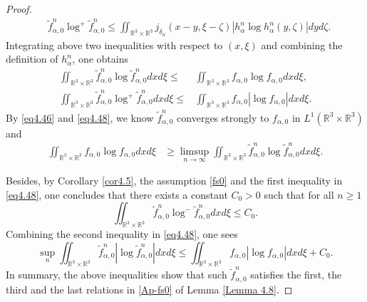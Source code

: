 \documentclass[reqno,11pt]{amsart}
\numberwithin{equation}{section}
\def\R{\mathbb{R}}
\begin{document}
\begin{proof}
\begin{equation*}
\begin{aligned}
			&\tilde{f}^n_{\alpha,0 } \log ^+ \tilde{f}^n_{\alpha,0 } \leq \iint_{\R^3 \times \R^3 } j_{\delta_n } (x-y, \xi - \zeta ) | h^n_\alpha \log h^n_\alpha (y,\zeta )|dyd\zeta.
		\end{aligned}
	\end{equation*}
Integrating above two inequalities with respect to $(x,\xi ) $ and combining the definition of $h^n_\alpha$, one obtains
	\begin{equation}\label{eq4.48}
		\begin{aligned}
            \iint_{\R^3 \times \R^3 } \tilde{f}^n_{\alpha,0 } \log \tilde{f}^n_{\alpha,0 } dxd\xi \leq & \iint_{\R^3 \times \R^3 } f_{\alpha,0 } \log f_{\alpha,0 } dxd\xi, \\
            \iint_{\R^3 \times \R^3 } \tilde{f}^n_{\alpha,0 } \log ^+ \tilde{f}^n_{\alpha,0 } dxd\xi \leq &  \iint_{\R^3 \times \R^3 } f_{\alpha,0 } | \log f_{\alpha,0 } | dxd \xi.
	\end{aligned}
	\end{equation}
	By \eqref{eq4.46} and \eqref{eq4.48}, we know $\tilde{f}^n_{\alpha,0 }$ converges strongly to $f_{\alpha,0 }$ in $L^1 (\R^3 \times \R^3 )$ and
	\begin{equation*}
		\begin{aligned}
   \iint_{\R^3 \times \R^3 } f_{\alpha,0 } \log f_{\alpha,0 } dxd\xi
  & \geq \limsup \limits_{n\rightarrow \infty }  \iint_{\R^3 \times \R^3 } \tilde{f}^n_{\alpha,0 } \log \tilde{f}^n_{\alpha,0 } dxd\xi .
		\end{aligned}
	\end{equation*}

Besides, by Corollary \ref{cor4.5}, the assumption \eqref{fs0} and the first inequality in \eqref{eq4.48}, one concludes that there exists a constant $C_0 > 0$ such that for all $n \geq 1$
	\begin{equation*}
		\iint_{\R^3 \times \R^3  } \tilde{f}^n_{\alpha,0 } \log^- \tilde{f}^n_{\alpha,0 } dxd\xi \leq C_0.
	\end{equation*}
Combining the second inequality in \eqref{eq4.48}, one sees
	\begin{equation*}
		\sup \limits_{n} \iint_{\R^3 \times \R^3  } \tilde{f}^n_{\alpha,0 }| \log \tilde{f}^n_{\alpha,0 }| dxd\xi \leq \iint_{\R^3 \times \R^3 } f_{\alpha,0 } |\log f_{\alpha,0 }| dxd\xi+ C_0.
	\end{equation*}
In summary, the above inequalities show that such $\tilde{f}^n_{\alpha,0 }$ satisfies the first, the third and the last relations in \eqref{Ap-fs0} of Lemma \ref{Lemma 4.8}. 


\end{proof}
\end{document}
